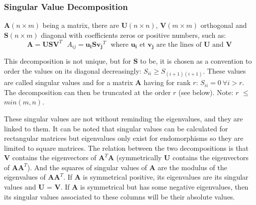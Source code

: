 \documentclass[12pt,a4paper]{article}
\begin{document}
\subsubsection{Singular Value Decomposition}

$\mathbf{A} (n \times m)$ being a matrix, there are $\mathbf{U} (n \times n)$, $\mathbf{V} (m \times m)$ orthogonal and $\mathbf{S} (n \times m)$ diagonal with coefficients zeros or positive numbers, such as:
\begin{equation}
\mathbf{A} = \mathbf{U}\mathbf{S}\mathbf{V}^T
~~~A_{ij} = \mathbf{u_i} \mathbf{S} \mathbf{v_j}^T
~~~\text{where }\mathbf{u_i}\text{ et }\mathbf{v_j}\text{ are the lines of }\mathbf{U}\text{ and }\mathbf{V}
\end{equation}

This decomposition is not unique, but for $\mathbf{S}$ to be, it is chosen as a convention to order the values on its diagonal decreasingly: $S_{ii} \geq S_{(i+1)(i+1)}$. These values are called singular values and for a matrix $\mathbf{A}$ having for rank $r$: 
$S_{ii} = 0~ \forall i > r$. The decomposition can then be truncated at the order $r$ (see below). Note: $r$ $\leq$ $min(m, n)$.

These singular values are not without reminding the eigenvalues, and they are linked to them. It can be noted that singular values can be calculated for rectangular matrices but eigenvalues only exist for endomorphisms so they are limited to square matrices. The relation between the two decompositions is that $\mathbf{V}$ contains the eigenvectors of $\mathbf{A}^T \mathbf{A}$ (symmetrically $\mathbf{U}$ contains the eigenvectors of $\mathbf{A}\mathbf{A}^T$). And the squares of singular values of $\mathbf{A}$ are the modulus of the eigenvalues of $\mathbf{A}\mathbf{A}^T$. If $\mathbf{A}$ is symmetrical positive, its eigenvalues are its singular values and $\mathbf{U}$ = $\mathbf{V}$. If $\mathbf{A}$ is symmetrical but has some negative eigenvalues, then its singular values associated to these columns will be their absolute values.
\end{document}
